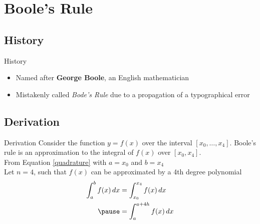 \documentclass{beamer}
\begin{document}

\section{Boole's Rule}

\subsection{History}

\begin{frame}{History \cite{booles_history}}
  \begin{itemize}
    \item Named after \textbf{George Boole}, an English mathematician
    \item Mistakenly called \textit{Bode's Rule} due to a propagation of a typographical error
  \end{itemize}
\end{frame}

\subsection{Derivation \cite{booles_quadrature}}

\begin{frame}{Derivation}
  Consider the function $y = f(x)$ over the interval $[x_0,\dots,x_4]$. Boole's rule is an approximation to the integral of $f(x)$ over $[x_0,x_4]$. \\ \pause 
  From Equation \ref{quadrature} with $a = x_0$ and $b = x_4$ \\ \pause 
  Let $n = 4$, such that $f(x)$ can be approximated by a 4th degree polynomial \\
  \begin{equation*}
    \begin{aligned}
      \int_a^b f(x) \mathop{dx} &= \int_{x_0}^{x_4} f(x) \mathop{dx} \\ \pause 
      &= \int_a^{a+4h} f(x) \mathop{dx}
    \end{aligned}
  \end{equation*}
\end{frame}
\end{document}
